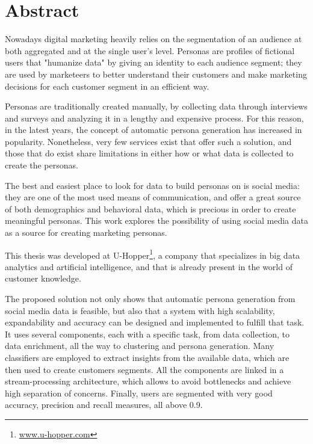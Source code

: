 \chapter*{Abstract} %
\label{cha:abstract}
Nowadays digital marketing heavily relies on the segmentation of an audience at both aggregated and at the single user's level. Personas are profiles of fictional users that "humanize data" by giving an identity to each audience segment; they are used by marketeers to better understand their customers and make marketing decisions for each customer segment in an efficient way. 

Personas are traditionally created manually, by collecting data through interviews and surveys and analyzing it in a lengthy and expensive process. For this reason, in the latest years, the concept of automatic persona generation has increased in popularity. Nonetheless, very few services exist that offer such a solution, and those that do exist share limitations in either how or what data is collected to create the personas.

The best and easiest place to look for data to build personas on is social media: they are one of the most used means of communication, and offer a great source of both demographics and behavioral data, which is precious in order to create meaningful personas. This work explores the possibility of using social media data as a source for creating marketing personas.

This thesis was developed at U-Hopper\footnote{\url{www.u-hopper.com}}, a company that specializes in big data analytics and artificial intelligence, and that is already present in the world of customer knowledge.

The proposed solution not only shows that automatic persona generation from social media data is feasible, but also that a system with high scalability, expandability and accuracy can be designed and implemented to fulfill that task. It uses several components, each with a specific task, from data collection, to data enrichment, all the way to clustering and persona generation. Many classifiers are employed to extract insights from the available data, which are then used to create customers segments. All the components are linked in a stream-processing architecture, which allows to avoid bottlenecks and achieve high separation of concerns. Finally, users are segmented with very good accuracy, precision and recall measures, all above 0.9.